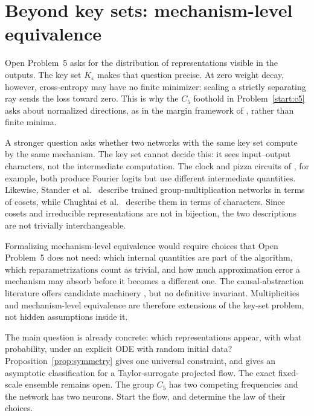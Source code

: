 \documentclass[11pt]{amsart}
\theoremstyle{plain}
\theoremstyle{definition}
\begin{document}
\section{Beyond key sets: mechanism-level equivalence}\label{sec:resist}

Open Problem~5 asks for the distribution of representations visible in the outputs. The key set $K_\varepsilon$ makes that question precise. At zero weight decay, however, cross-entropy may have no finite minimizer: scaling a strictly separating ray sends the loss toward zero. This is why the $C_5$ foothold in Problem~\ref{start:c5} asks about normalized directions, as in the margin framework of \cite{wei2019,lyu2020,morwani2024}, rather than finite minima.

A stronger question asks whether two networks with the same key set compute by the same mechanism. The key set cannot decide this: it sees input--output characters, not the intermediate computation. The clock and pizza circuits of \cite{zhong2023}, for example, both produce Fourier logits but use different intermediate quantities. Likewise, Stander et al.~\cite{stander2024} describe trained group-multiplication networks in terms of cosets, while Chughtai et al.~\cite{chughtai2023} describe them in terms of characters. Since cosets and irreducible representations are not in bijection, the two descriptions are not trivially interchangeable.

Formalizing mechanism-level equivalence would require choices that Open Problem~5 does not need: which internal quantities are part of the algorithm, which reparametrizations count as trivial, and how much approximation error a mechanism may absorb before it becomes a different one. The causal-abstraction literature offers candidate machinery \cite{geiger2025}, but no definitive invariant. Multiplicities and mechanism-level equivalence are therefore extensions of the key-set problem, not hidden assumptions inside it.

The main question is already concrete: which representations appear, with what probability, under an explicit ODE with random initial data? Proposition~\ref{prop:symmetry} gives one universal constraint, and \cite{he2026spectral} gives an asymptotic classification for a Taylor-surrogate projected flow. The exact fixed-scale ensemble remains open. The group $C_5$ has two competing frequencies and the network has two neurons. Start the flow, and determine the law of their choices.
\end{document}
